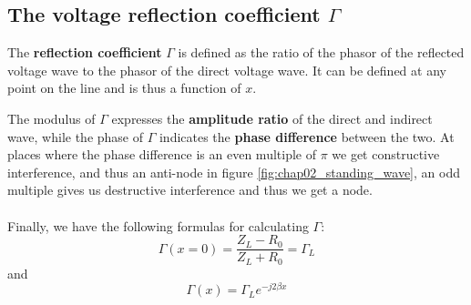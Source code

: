 \documentclass[../transmission.tex]{subfiles}
\begin{document}
		\subsection{The voltage reflection coefficient $\Gamma$}
			The \textbf{reflection coefficient} $\Gamma$ is defined as the ratio of the phasor of the reflected voltage wave to the phasor of the direct voltage wave. It can be defined at any point on the line and is thus a function of $x$.
			
			The modulus of $\Gamma$ expresses the \textbf{amplitude ratio} of the direct and indirect wave, while the phase of $\Gamma$ indicates the \textbf{phase difference} between the two. At places where the phase difference is an even multiple of $\pi$ we get constructive interference, and thus an anti-node in figure \ref{fig:chap02_standing_wave}, an odd multiple gives us destructive interference and thus we get a node. \\
			\\
			Finally, we have the following formulas for calculating $\Gamma$:
			\begin{equation}
				\Gamma(x=0) = \frac{Z_L-R_0}{Z_L+R_0} = \Gamma_L
			\end{equation}
			and
			\begin{equation}
				\Gamma(x)=\Gamma_Le^{-j2\beta x}
			\end{equation}
\end{document}
